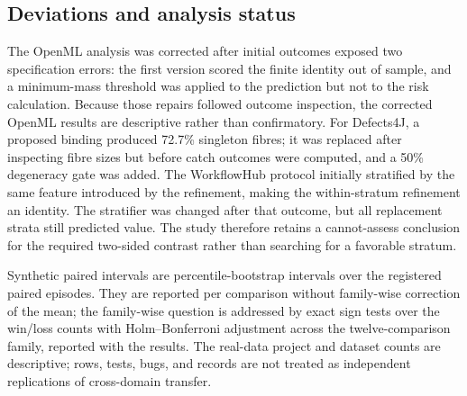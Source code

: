 \subsection{Deviations and analysis status}
The OpenML analysis was corrected after initial outcomes exposed two specification errors: the first version scored the finite identity out of sample, and a minimum-mass threshold was applied to the prediction but not to the risk calculation. Because those repairs followed outcome inspection, the corrected OpenML results are descriptive rather than confirmatory. For Defects4J, a proposed binding produced 72.7\% singleton fibres; it was replaced after inspecting fibre sizes but before catch outcomes were computed, and a 50\% degeneracy gate was added. The WorkflowHub protocol initially stratified by the same feature introduced by the refinement, making the within-stratum refinement an identity. The stratifier was changed after that outcome, but all replacement strata still predicted value. The study therefore retains a cannot-assess conclusion for the required two-sided contrast rather than searching for a favorable stratum.

Synthetic paired intervals are percentile-bootstrap intervals over the registered paired episodes. They are reported per comparison without family-wise correction of the mean; the family-wise question is addressed by exact sign tests over the win/loss counts with Holm--Bonferroni adjustment across the twelve-comparison family, reported with the results. The real-data project and dataset counts are descriptive; rows, tests, bugs, and records are not treated as independent replications of cross-domain transfer.
